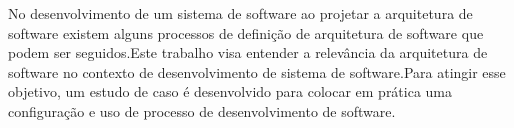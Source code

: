 No desenvolvimento de um sistema de software ao projetar a arquitetura de software existem alguns processos de definição de arquitetura de software que podem ser seguidos.Este trabalho visa entender a relevância da arquitetura de software no contexto de desenvolvimento de sistema de software.Para atingir esse objetivo, um estudo de caso é desenvolvido para colocar em prática
uma configuração e uso de processo de desenvolvimento de software.